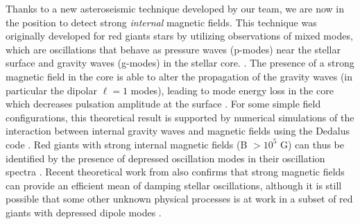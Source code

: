 Thanks to a new asteroseismic technique developed by our team, we are now in the position to detect strong {\it internal} magnetic fields. This technique was originally developed for red giants stars by utilizing observations of mixed modes, which are oscillations that behave as pressure waves (p-modes) near the stellar surface and gravity waves (g-modes) in the stellar core. \citep[e.g][]{Beck_2011}. The presence of a strong magnetic field in the core is able to alter the propagation of the gravity waves (in particular the dipolar $\ell =1$ modes),
leading to mode energy loss in the core which decreases pulsation amplitude at the surface \citep{Fuller_2015}. For some simple field configurations, this theoretical result is supported  by numerical simulations of the interaction between internal gravity waves and magnetic fields using the Dedalus code \citep{Lecoanet_2016}. Red giants with strong internal magnetic fields (B $> 10^5$ G) can thus be identified by the presence of depressed oscillation modes in their oscillation spectra \citep{Fuller_2015,Stello_2016}. Recent theoretical work from \citet{2017MNRAS.467.3212L} also confirms that  strong magnetic fields can provide an efficient mean of damping stellar oscillations, although it is still possible that some other unknown physical processes is at work in a subset of red giants with depressed dipole modes \citet{Mosser_2017}.
